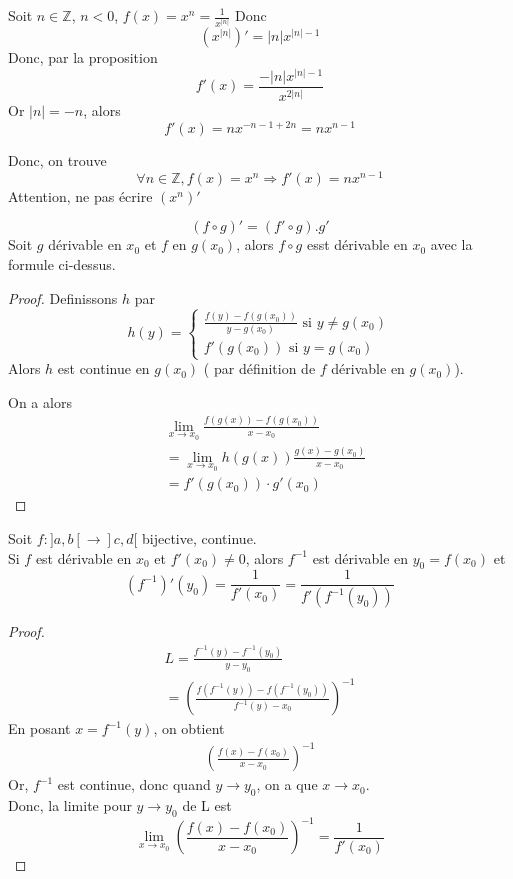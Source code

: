 \documentclass[../main.tex]{subfiles}
\begin{document}
\begin{exemple}
	Soit $n \in \mathbb{Z}$, $n< 0$, $f( x) = x^{n} = \frac{1}{x^{|n|}}$ 
	Donc 
	\[ 
		( x^{|n|}) ' = |n| x^{|n|-1}
	\]
	Donc, par la proposition
	\[ 
		f'( x)  = \frac{- |n| x^{|n|-1}}{x^{2|n|}}
	\]
	Or $|n| = -n$, alors
	\[ 
		f'( x)  = nx^{-n-1+ 2n}= n x^{n-1}
	\]
	
	
\end{exemple}
\begin{propo}
Donc, on trouve
\[ 
	\forall n \in \mathbb{Z}, f( x) = x^{n} \Rightarrow f'( x) = n x^{n-1}
\]
Attention, ne pas écrire $ ( x^{n}) '$
\end{propo}
\begin{thm}

\[ 
	( f \circ g) ' = ( f' \circ g ) . g'
\]
Soit $g$ dérivable en $x_0$ et $f$ en $g( x_0) $, alors $f\circ g$ esst dérivable en $x_0$ avec la formule ci-dessus.
\end{thm}
\begin{proof}
Definissons $h$ par
\[ 
	h( y) = 
	\begin{cases}
		\frac{f( y ) - f( g( x_0) ) }{y - g( x_0) } \text{  si } y \neq g( x_0) \\
		f'( g( x_0) ) \text{ si } y = g( x_0) 
	\end{cases}
\]
Alors $h$ est continue en $g( x_0) $ ( par définition de $f$ dérivable en $g( x_0) $).

On a alors
\begin{align*}
&\lim_{x \to x_0} \frac{f( g( x) ) - f( g( x_0) ) }{x-x_0}\\
&= \lim_{x \to x_0} h( g( x) ) \frac{g( x) - g( x_0)  }{x-x_0}\\
&= f'( g( x_0) ) \cdot g'( x_0)
\end{align*}

\end{proof}

\begin{thm}
	Soit $f: ]a,b[ \to ]c,d[$ bijective, continue.\\
	Si $f$ est dérivable en $x_0$ et $f'( x_0) \neq 0$, alors
	$f^{-1}$ est dérivable en $y_0= f( x_0) $ et
	\[ 
		( f^{-1} )'( y_0)  = \frac{1}{f'( x_0) }= \frac{1}{f'( f^{-1}( y_0) ) }
	\]
	
\end{thm}
\begin{proof}
\begin{align*}
	L= \frac{f^{-1}( y) - f^{-1}( y_0) }{y-y_0}\\
	= \left( \frac{f( f^{-1}( y) ) - f( f^{-1}( y_0) )  }{f^{-1}( y)- x_0} \right)^{-1}
\end{align*}
En posant $x= f^{-1}( y) $, on obtient
\begin{align*}
	\left( \frac{f( x) - f( x_0) }{x-x_0} \right)^{-1}
\end{align*}
Or, $f^{-1}$ est continue, donc quand $y \to y_0$, on a que $x\to x_0$.\\
Donc, la limite pour $y\to y_0$ de L est
\[ 
	\lim_{x \to x_0} \left( \frac{f( x) - f( x_0) }{x-x_0}\right) ^{-1} = \frac{1}{f'( x_0) }
\]



\end{proof}



	
	
	

			
\end{document}
